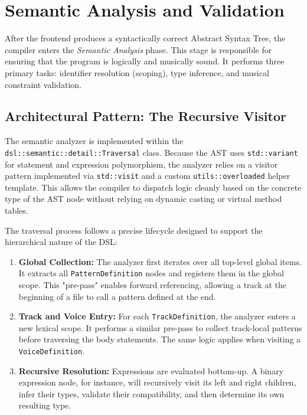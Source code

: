 \section{Semantic Analysis and Validation}\label{sec:implementation-semantic}

After the frontend produces a syntactically correct Abstract Syntax Tree, the compiler enters the
\textit{Semantic Analysis} phase.
This stage is responsible for ensuring that the program is logically and musically sound.
It performs three primary tasks: identifier resolution (scoping), type inference, and musical constraint validation.

\subsection{Architectural Pattern: The Recursive Visitor}

The semantic analyzer is implemented within the \texttt{dsl::semantic::detail::Traversal} class.
Because the AST uses \texttt{std::variant} for statement and expression polymorphism, the analyzer relies on
a visitor pattern implemented via \texttt{std::visit} and a custom \texttt{utils::overloaded} helper template.
This allows the compiler to dispatch logic cleanly based on the concrete type of the AST node without relying
on dynamic casting or virtual method tables.

The traversal process follows a precise lifecycle designed to support the hierarchical nature of the DSL:
\begin{enumerate}
  \item \textbf{Global Collection:} The analyzer first iterates over all top-level global items. It extracts
    all \texttt{PatternDefinition} nodes and registers them in the global scope. This "pre-pass" enables
    forward referencing, allowing a track at the beginning of a file to call a pattern defined at the end.
  \item \textbf{Track and Voice Entry:} For each \texttt{TrackDefinition}, the analyzer enters a new lexical
    scope. It performs a similar pre-pass to collect track-local patterns before traversing the body
    statements. The same logic applies when visiting a \texttt{VoiceDefinition}.
  \item \textbf{Recursive Resolution:} Expressions are evaluated bottom-up. A binary expression node, for
    instance, will recursively visit its left and right children, infer their types, validate their
    compatibility, and then determine its own resulting type.
\end{enumerate}

